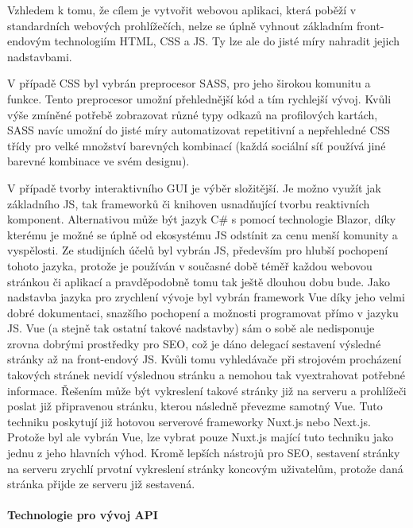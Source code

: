 			Vzhledem k tomu, že cílem je vytvořit webovou aplikaci, která poběží v standardních webových prohlížečích,
			nelze se úplně vyhnout základním front-endovým technologiím \Ac{HTML}, \Ac{CSS} a \ac{JS}.
			Ty lze ale do jisté míry nahradit jejich nadstavbami.

			V případě \Ac{CSS} byl vybrán preprocesor \Ac{SASS}, pro jeho širokou komunitu a funkce.
			Tento preprocesor umožní přehlednější kód a tím rychlejší vývoj.
			Kvůli výše zmíněné potřebě zobrazovat různé typy odkazů na profilových kartách, \ac{SASS} navíc umožní
			do jisté míry automatizovat repetitivní a nepřehledné \ac{CSS} třídy pro velké množství barevných kombinací
			(každá sociální síť používá jiné barevné kombinace ve svém designu).

			V případě tvorby interaktivního \Ac{GUI} je výběr složitější.
			Je možno využít jak základního \ac{JS}, tak frameworků či knihoven usnadňující tvorbu reaktivních komponent.
			Alternativou může být jazyk C\# s pomocí technologie Blazor, díky kterému je možné se úplně od ekosystému
			\ac{JS} odstínit za cenu menší komunity a vyspělosti.
			Ze studijních účelů byl vybrán \ac{JS}, především pro hlubší pochopení tohoto jazyka, protože je používán v současné
			době téměř každou webovou stránkou či aplikací a pravděpodobně tomu tak ještě dlouhou dobu bude.
			Jako nadstavba jazyka pro zrychlení vývoje byl vybrán framework Vue díky jeho velmi dobré dokumentaci, snazšího
			pochopení a možnosti programovat přímo v jazyku \ac{JS}.
			Vue (a stejně tak ostatní takové nadstavby) sám o sobě ale nedisponuje zrovna dobrými prostředky pro \Ac{SEO},
			což je dáno delegací sestavení výsledné stránky až na front-endový \ac{JS}.
			Kvůli tomu vyhledávače při strojovém procházení takových stránek nevidí výslednou stránku a nemohou tak
			vyextrahovat potřebné informace.
			Řešením může být vykreslení takové stránky již na serveru a prohlížeči poslat již připravenou stránku, kterou
			následně převezme samotný Vue.
			Tuto techniku poskytují již hotovou serverové frameworky Nuxt.js nebo Next.js.
			Protože byl ale vybrán Vue, lze vybrat pouze Nuxt.js mající tuto techniku jako jednu z jeho hlavních výhod.
			Kromě lepších nástrojů pro \ac{SEO}, sestavení stránky na serveru zrychlí prvotní vykreslení stránky
			koncovým uživatelům, protože daná stránka přijde ze serveru již sestavená.

			\paragraph{Technologie pro vývoj API}

